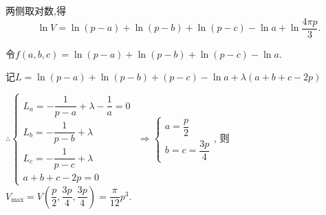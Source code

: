   两侧取对数,得\[\ln V = \ln \left( {p - a} \right) + \ln \left( {p - b} \right) + \ln \left( {p - c} \right) - \ln a + \ln \dfrac{{4\pi p}}{3}.\]

  令$ f\left( {a,b,c} \right) = \ln \left( {p - a} \right) + \ln \left( {p - b} \right) + \ln \left( {p - c} \right) - \ln a. $

  记\(L = \ln \left( {p - a} \right) + \ln \left( {p - b} \right) + \left( {p - c} \right) - \ln a + \lambda \left( {a + b + c - 2p} \right) \)

  $ \therefore \begin{cases}
  {L_a} =  - \dfrac{1}{{p - a}} + \lambda  - \dfrac{1}{a} = 0\\
  {L_b} =  - \dfrac{1}{{p - b}} + \lambda \\
  {L_c} =  - \dfrac{1}{{p - c}} + \lambda \\
  a + b + c - 2p = 0
  \end{cases} $
  \( \Rightarrow \begin{cases}
  a = \dfrac{p}{2}\\
  b = c = \dfrac{{3p}}{4}
  \end{cases} \),
  则\( {V_{\max }} = V\left( {\dfrac{p}{2},\dfrac{{3p}}{4},\dfrac{{3p}}{4}} \right) = \dfrac{\pi }{{12}}{p^3}\).